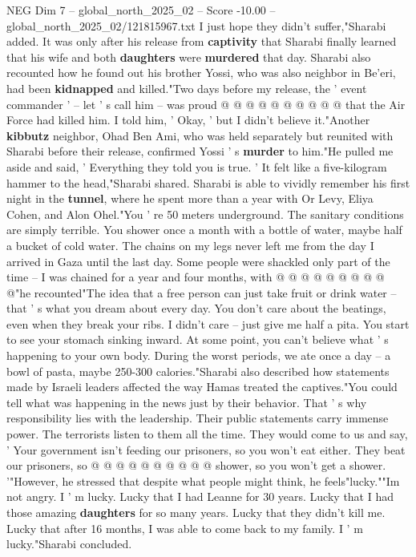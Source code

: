 \begin{textsample}{NEG Dim 7 – global\_north\_2025\_02 – Score -10.00 – global\_north\_2025\_02/121815967.txt}
I just hope they didn't suffer,"Sharabi added.
It was only after his release from \textbf{captivity} that Sharabi finally learned that his wife and both \textbf{daughters} were \textbf{murdered} that day.
Sharabi also recounted how he found out his brother Yossi, who was also neighbor in Be'eri, had been \textbf{kidnapped} and killed."Two days before my release, the ' event commander ' -- let ' s call him -- was proud @ @ @ @ @ @ @ @ @ @ that the Air Force had killed him.
I told him, ' Okay, ' but I didn't believe it."Another \textbf{kibbutz} neighbor, Ohad Ben Ami, who was held separately but reunited with Sharabi before their release, confirmed Yossi ' s \textbf{murder} to him."He pulled me aside and said, ' Everything they told you is true. ' It felt like a five-kilogram hammer to the head,"Sharabi shared.
Sharabi is able to vividly remember his first night in the \textbf{tunnel}, where he spent more than a year with Or Levy, Eliya Cohen, and Alon Ohel."You ' re 50 meters underground.
The sanitary conditions are simply terrible.
You shower once a month with a bottle of water, maybe half a bucket of cold water.
The chains on my legs never left me from the day I arrived in Gaza until the last day.
Some people were shackled only part of the time -- I was chained for a year and four months, with @ @ @ @ @ @ @ @ @ @"he recounted"The idea that a free person can just take fruit or drink water -- that ' s what you dream about every day.
You don't care about the beatings, even when they break your ribs.
I didn't care -- just give me half a pita.
You start to see your stomach sinking inward.
At some point, you can't believe what ' s happening to your own body.
During the worst periods, we ate once a day -- a bowl of pasta, maybe 250-300 calories."Sharabi also described how statements made by Israeli leaders affected the way Hamas treated the captives."You could tell what was happening in the news just by their behavior.
That ' s why responsibility lies with the leadership.
Their public statements carry immense power.
The terrorists listen to them all the time.
They would come to us and say, ' Your government isn't feeding our prisoners, so you won't eat either.
They beat our prisoners, so @ @ @ @ @ @ @ @ @ @ shower, so you won't get a shower. '"However, he stressed that despite what people might think, he feels"lucky.""Im not angry.
I ' m lucky.
Lucky that I had Leanne for 30 years.
Lucky that I had those amazing \textbf{daughters} for so many years.
Lucky that they didn't kill me.
Lucky that after 16 months, I was able to come back to my family.
I ' m lucky."Sharabi concluded.

\end{textsample}
